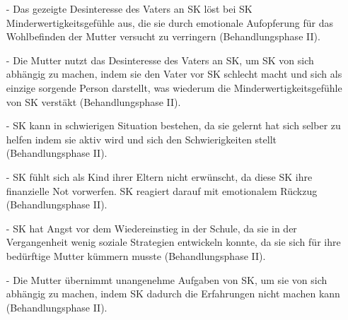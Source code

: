 \begin{itemize}
 \item [-] Das gezeigte Desinteresse des Vaters an SK löst bei SK Minderwertigkeitsgefühle aus, die sie durch emotionale Aufopferung für das Wohlbefinden der Mutter versucht zu verringern (Behandlungsphase II).
 \item [-] Die Mutter nutzt das Desinteresse des Vaters an SK, um SK von sich abhängig zu machen, indem sie den Vater vor SK schlecht macht und sich als einzige sorgende Person darstellt, was wiederum die Minderwertigkeitsgefühle von SK verstäkt (Behandlungsphase II).
 \item [-] SK kann in schwierigen Situation bestehen, da sie gelernt hat sich selber zu helfen indem sie aktiv wird und sich den Schwierigkeiten stellt (Behandlungsphase II).
 \item [-] SK fühlt sich als Kind ihrer Eltern nicht erwünscht, da diese SK ihre finanzielle Not vorwerfen. SK reagiert darauf mit emotionalem Rückzug (Behandlungsphase II).
 \item [-] SK hat Angst vor dem Wiedereinstieg in der Schule, da sie in der Vergangenheit wenig soziale Strategien entwickeln konnte, da sie sich für ihre bedürftige Mutter kümmern musste (Behandlungsphase II).
 \item [-] Die Mutter übernimmt unangenehme Aufgaben von SK, um sie von sich abhängig zu machen, indem SK dadurch die Erfahrungen nicht machen kann (Behandlungsphase II). 
\end{itemize}

